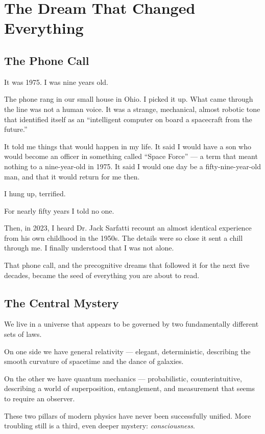 \chapter{The Dream That Changed Everything}

\section{The Phone Call}

It was 1975. I was nine years old.

The phone rang in our small house in Ohio. I picked it up. What came through the line was not a human voice. It was a strange, mechanical, almost robotic tone that identified itself as an ``intelligent computer on board a spacecraft from the future.''

It told me things that would happen in my life. It said I would have a son who would become an officer in something called ``Space Force'' — a term that meant nothing to a nine-year-old in 1975. It said I would one day be a fifty-nine-year-old man, and that it would return for me then.

I hung up, terrified.

For nearly fifty years I told no one.

Then, in 2023, I heard Dr. Jack Sarfatti recount an almost identical experience from his own childhood in the 1950s. The details were so close it sent a chill through me. I finally understood that I was not alone.

That phone call, and the precognitive dreams that followed it for the next five decades, became the seed of everything you are about to read.

\section{The Central Mystery}

We live in a universe that appears to be governed by two fundamentally different sets of laws.

On one side we have general relativity — elegant, deterministic, describing the smooth curvature of spacetime and the dance of galaxies.

On the other we have quantum mechanics — probabilistic, counterintuitive, describing a world of superposition, entanglement, and measurement that seems to require an observer.

These two pillars of modern physics have never been successfully unified. More troubling still is a third, even deeper mystery: \textit{consciousness}.

